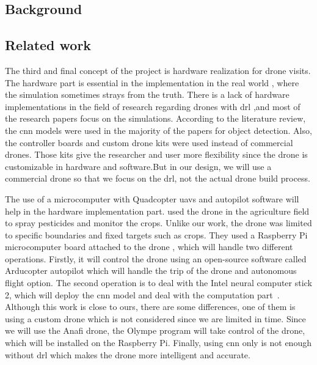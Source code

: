 \documentclass[../main.tex]{subfiles}
\begin{document}
\subsection{Background}

\blindtext

\subsection{Related work}



		The third and final concept of the project is hardware realization for drone visits.
		The hardware part is essential in the implementation in the real world
		, where the simulation sometimes strays from the truth.
		There is a lack of hardware implementations in the field of research regarding drones with \gls{drl}
		 ,and most of the research papers focus on the simulations.
		According to the literature review, 
		the \gls{cnn} models were used in the majority of the papers for object detection. 
		Also, the controller boards and custom drone kits were used instead of commercial drones.
		Those kits give the researcher and user more flexibility since the drone is customizable 
		in hardware and software.But in our design, we will use a commercial drone so that we focus
		 on the \gls{drl}, not the actual drone build process. 


	The use of a microcomputer with Quadcopter \glspl{uav} and autopilot software will help in the hardware implementation part.
	\citeauthor{Khan21} used the drone in the agriculture field to spray 
	pesticides and monitor the crops. Unlike our work, the drone was limited to specific
	boundaries and fixed targets such as crops.
	They used a Raspberry Pi microcomputer board attached to the drone
	, which will handle two different operations. Firstly, it will control the drone using an open-source
	 software called Arducopter autopilot which will handle the trip of the drone and autonomous 
	 flight option. The second operation is to deal with the Intel neural computer stick 2, 
	 which will deploy the \gls{cnn} model and deal with the computation part~\cite{Khan21}.
	Although this work is close to ours, there are some differences, 
	one of them is using a custom drone which is not considered since we are limited in time.
	Since we will use the Anafi drone, the Olympe program will take control of the drone, which will
	 be installed on the Raspberry Pi. Finally, using \gls{cnn} only is not enough without \gls{drl} 
	 which makes the drone more intelligent and accurate.
\end{document}
